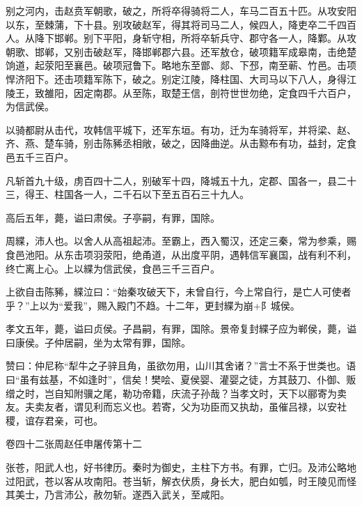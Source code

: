 \documentclass[12pt,UTF8]{ctexbook}
\begin{document}
别之河内，击赵贲军朝歌，破之，所将卒得骑将二人，车马二百五十匹。从攻安阳以东，至棘蒲，下十县。别攻破赵军，得其将司马二人，候四人，降吏卒二千四百人。从降下邯郸。别下平阳，身斩守相，所将卒斩兵守、郡守各一人，降鄴。从攻朝歌、邯郸，又别击破赵军，降邯郸郡六县。还军敖仓，破项籍军成皋南，击绝楚饷道，起荥阳至襄邑。破项冠鲁下。略地东至鄫、郯、下邳，南至蕲、竹邑。击项悍济阳下。还击项籍军陈下，破之。别定江陵，降柱国、大司马以下八人，身得江陵王，致雒阳，因定南郡。从至陈，取楚王信，剖符世世勿绝，定食四千六百户，为信武侯。



以骑都尉从击代，攻韩信平城下，还军东垣。有功，迁为车骑将军，并将梁、赵、齐、燕、楚车骑，别击陈豨丞相敞，破之，因降曲逆。从击黥布有功，益封，定食邑五千三百户。



凡斩首九十级，虏百四十二人，别破军十四，降城五十九，定郡、国各一，县二十三，得王、柱国各一人，二千石以下至五百石三十九人。



高后五年，薨，谥曰肃侯。子亭嗣，有罪，国除。



周緤，沛人也。以舍人从高祖起沛。至霸上，西入蜀汉，还定三秦，常为参乘，赐食邑池阳。从东击项羽荥阳，绝甬道，从出度平阴，遇韩信军襄国，战有利不利，终亡离上心。上以緤为信武侯，食邑三千三百户。



上欲自击陈豨，緤泣曰：“始秦攻破天下，未曾自行，今上常自行，是亡人可使者乎？”上以为“爱我”，赐入殿门不趋。十二年，更封緤为崩+阝城侯。



孝文五年，薨，谥曰贞侯。子昌嗣，有罪，国除。景帝复封緤子应为郸侯，薨，谥曰康侯。子仲居嗣，坐为太常有罪，国除。



赞曰：仲尼称“犁牛之子骍且角，虽欲勿用，山川其舍诸？”言士不系于世类也。语曰“虽有兹基，不如逢时”，信矣！樊哙、夏侯婴、灌婴之徒，方其鼓刀、仆御、贩缯之时，岂自知附骥之尾，勒功帝籍，庆流子孙哉？当孝文时，天下以郦寄为卖友。夫卖友者，谓见利而忘义也。若寄，父为功臣而又执劫，虽催吕禄，以安社稷，谊存君亲，可也。





卷四十二张周赵任申屠传第十二



张苍，阳武人也，好书律历。秦时为御史，主柱下方书。有罪，亡归。及沛公略地过阳武，苍以客从攻南阳。苍当斩，解衣伏质，身长大，肥白如瓠，时王陵见而怪其美士，乃言沛公，赦勿斩。遂西入武关，至咸阳。
\end{document}
